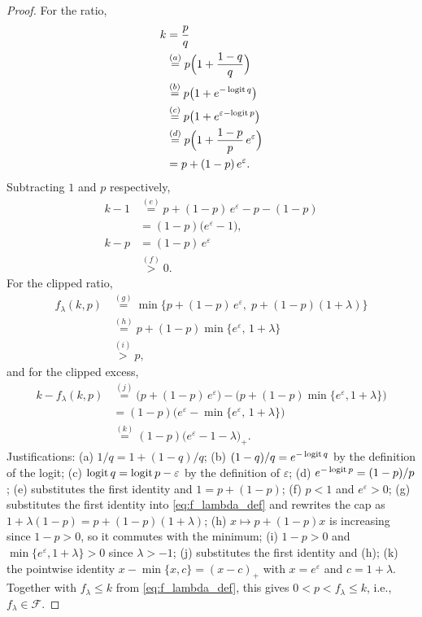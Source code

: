 \begin{proof}
For the ratio,
\begin{align*}
k
&= \frac{p}{q}\\
&\overset{(a)}{=} p\Big(1+\frac{1-q}{q}\Big)\\
&\overset{(b)}{=} p\big(1+e^{-\operatorname{logit} q}\big)\\
&\overset{(c)}{=} p\big(1+e^{\varepsilon-\operatorname{logit} p}\big)\\
&\overset{(d)}{=} p\Big(1+\frac{1-p}{p}\,e^{\varepsilon}\Big)\\
&= p+(1-p)\,e^{\varepsilon}.
\end{align*}
Subtracting $1$ and $p$ respectively,
\begin{align*}
k-1
&\overset{(e)}{=} p+(1-p)\,e^{\varepsilon}-p-(1-p)\\
&= (1-p)\big(e^{\varepsilon}-1\big),\\[4pt]
k-p
&= (1-p)\,e^{\varepsilon}\\
&\overset{(f)}{>} 0 .
\end{align*}
For the clipped ratio,
\begin{align*}
f_\lambda(k,p)
&\overset{(g)}{=} \min\big\{p+(1-p)\,e^{\varepsilon},\;p+(1-p)(1+\lambda)\big\}\\
&\overset{(h)}{=} p+(1-p)\min\big\{e^{\varepsilon},\,1+\lambda\big\}\\
&\overset{(i)}{>} p ,
\end{align*}
and for the clipped excess,
\begin{align*}
k-f_\lambda(k,p)
&\overset{(j)}{=} \big(p+(1-p)\,e^{\varepsilon}\big)-\big(p+(1-p)\min\{e^{\varepsilon},1+\lambda\}\big)\\
&= (1-p)\Big(e^{\varepsilon}-\min\big\{e^{\varepsilon},\,1+\lambda\big\}\Big)\\
&\overset{(k)}{=} (1-p)\big(e^{\varepsilon}-1-\lambda\big)_+ .
\end{align*}
Justifications: (a) $1/q=1+(1-q)/q$; (b) $(1-q)/q=e^{-\operatorname{logit} q}$ by the
definition of the logit; (c) $\operatorname{logit} q=\operatorname{logit} p-\varepsilon$ by the definition
of $\varepsilon$; (d) $e^{-\operatorname{logit} p}=(1-p)/p$; (e) substitutes the first
identity and $1=p+(1-p)$; (f) $p<1$ and $e^{\varepsilon}>0$; (g) substitutes
the first identity into \eqref{eq:f_lambda_def} and rewrites the cap as
$1+\lambda(1-p)=p+(1-p)(1+\lambda)$; (h) $x\mapsto p+(1-p)x$ is increasing
since $1-p>0$, so it commutes with the minimum; (i) $1-p>0$ and
$\min\{e^{\varepsilon},1+\lambda\}>0$ since $\lambda>-1$; (j) substitutes the
first identity and (h); (k) the pointwise identity $x-\min\{x,c\}=(x-c)_+$ with
$x=e^{\varepsilon}$ and $c=1+\lambda$. Together with $f_\lambda\le k$ from
\eqref{eq:f_lambda_def}, this gives $0<p<f_\lambda\le k$, i.e.,
$f_\lambda\in\mathcal F$.
\end{proof}

